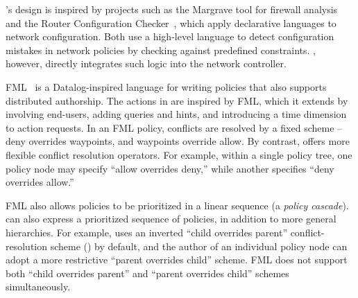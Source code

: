 \sys's design is inspired by projects such as the Margrave tool for firewall 
analysis~\cite{n++:lisa-margrave-firewalls} and the Router Configuration
Checker~\cite{Feamster:2005}, which apply declarative languages to
network configuration. Both use a high-level language to detect configuration 
mistakes in network policies by checking against predefined constraints. 
\sys, however, directly integrates such logic into the network
controller.

FML~\cite{Hinrichs:2009} is a Datalog-inspired language for writing
policies that also supports distributed authorship.  
The actions in \sys are inspired by
FML, which it
extends by involving end-users, adding queries and hints, and
introducing a time dimension to action requests.
In an FML policy,
conflicts are resolved by a fixed scheme -- deny overrides waypoints,
and waypoints override allow. By contrast, \sys offers more
flexible conflict resolution operators.
For example, within a single \treelang policy tree,
one policy node may specify ``allow overrides deny,'' while another
specifies ``deny overrides allow.''

FML also allows policies to be prioritized in a linear sequence (a
\emph{policy cascade}). \sys can also express a prioritized sequence of
policies, in addition to more general hierarchies.  
For example, \sys
uses an inverted ``child overrides parent'' conflict-resolution scheme
() by default, and the author of an individual
policy node can adopt a more restrictive ``parent overrides child''
scheme. FML does not support both ``child overrides parent'' and
``parent overrides child'' schemes simultaneously.


{\color{red}

}

